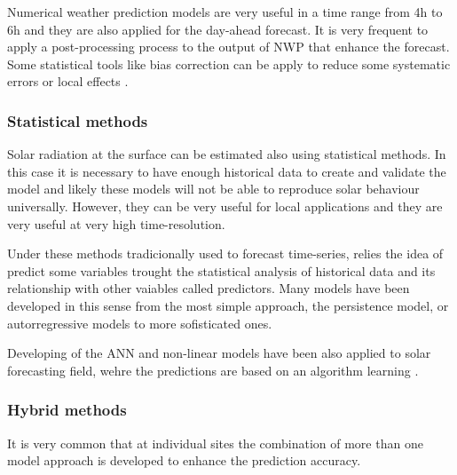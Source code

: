 Numerical weather prediction models are very useful in a time range from 4h to 6h and they are also applied for the day-ahead forecast. It is very frequent to apply a post-processing process to the output of NWP that enhance the forecast. Some statistical tools like bias correction can be apply to reduce some systematic errors or local effects \cite*{Diagnen2013}.

\subsubsection{Statistical methods}

Solar radiation at the surface can be estimated also using statistical methods. In this case it is necessary to have enough historical data to create and validate the model and likely these models will not be able to reproduce solar behaviour universally. However, they can be very useful for local applications and they are very useful at very high time-resolution.

Under these methods tradicionally used to forecast time-series, relies the idea of predict some variables trought the statistical analysis of historical data and its relationship with other vaiables called predictors. Many models have been developed in this sense from the most simple approach, the persistence model, or autorregressive models to more sofisticated ones. \cite*{Reikard2009, bacher2009, Inman2013} 

Developing of the ANN and non-linear models have been also applied to solar forecasting field, wehre the predictions are based on an algorithm learning \cite{Mellit2008}. 


\subsubsection{Hybrid methods}

It is very common that at individual sites the combination of more than one model approach is developed to enhance the prediction accuracy.
 
